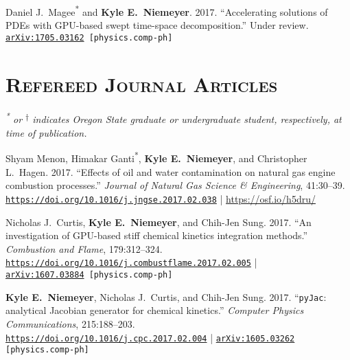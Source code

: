 \documentclass[margin,line,11pt]{res}
\makeatletter
\newlength{\bibhang}
\newlength{\bibsep}
 {\@listi \global\bibsep\itemsep \global\advance\bibsep by\parsep}
\newenvironment{bibenum*}
  {\renewcommand\labelenumi{\theenumi.}%
   \etaremune[
     topsep=0pt,
     itemsep=\bibsep,
     parsep=0pt,partopsep=0pt,
     itemindent=-\bibhang,
     leftmargin={\bibhang+\widthof{[999]}}]}
  {\endetaremune}
\newcommand*{\doi}[1]{\href{https://doi.org/#1}{\nolinkurl{https://doi.org/#1}}}
\newcommand*{\grad}[0]{\textsuperscript{*}}
\newcommand*{\ugrad}[0]{\textsuperscript{$\dagger$}}
\makeatother
\begin{document}
\begin{resume}
\begin{bibenum*}
\item Daniel J.~Magee\textsuperscript{*} and \textbf{Kyle E.~Niemeyer}.
2017.
``Accelerating solutions of PDEs with GPU-based swept time-space decomposition.''
Under review. {\tt \href{https://arxiv.org/abs/1705.03162}{arXiv:1705.03162} [physics.comp-ph]}



\end{bibenum*}

\section{\textsc{Refereed Journal Articles}}

\textit{\grad{} or \ugrad{} indicates Oregon State
graduate or undergraduate student, respectively, at time of publication.}
\\

\begin{bibenum*}

\item Shyam Menon, Himakar Ganti\textsuperscript{*}, \textbf{Kyle E.~Niemeyer}, and Christopher L.~Hagen.
2017.
``Effects of oil and water contamination on natural gas engine combustion processes.''
\textit{Journal of Natural Gas Science \& Engineering}, 41:30--39.
\doi{10.1016/j.jngse.2017.02.038} | \url{https://osf.io/h5dru/}

\item Nicholas J.~Curtis, \textbf{Kyle E.~Niemeyer}, and Chih-Jen Sung.
2017.
``An investigation of GPU-based stiff chemical kinetics integration methods.''
\textit{Combustion and Flame}, 179:312--324.
\doi{10.1016/j.combustflame.2017.02.005} | \\
{\tt \href{http://arxiv.org/abs/1607.03884}{arXiv:1607.03884} [physics.comp-ph]}

\item \textbf{Kyle E.~Niemeyer}, Nicholas J.~Curtis, and Chih-Jen Sung.
2017.
``\texttt{pyJac}: analytical Jacobian generator for chemical kinetics.''
\textit{Computer Physics Communications}, 215:188--203. \\
\doi{10.1016/j.cpc.2017.02.004} |
{\tt \href{http://arxiv.org/abs/1605.03262}{arXiv:1605.03262} [physics.comp-ph]}


\end{bibenum*}
\end{resume}
\end{document}
